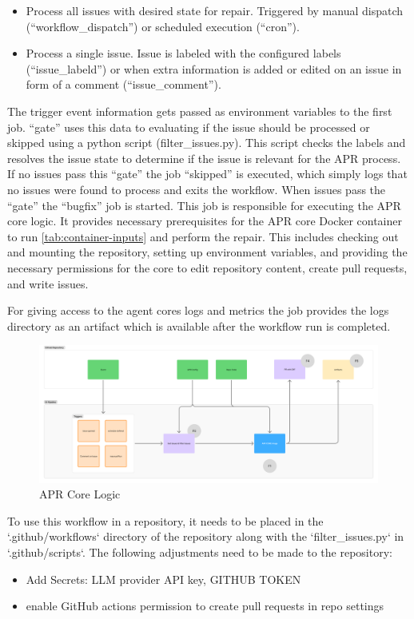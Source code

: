 \begin{itemize}
    \item Process all issues with desired state for repair. Triggered by manual dispatch (``workflow\_dispatch'') or scheduled execution (``cron'').
    \item Process a single issue. Issue is labeled with the configured labels (``issue\_labeld'') or when extra information is added or edited on an issue in form of a comment (``issue\_comment'').
\end{itemize}

The trigger event information gets passed as environment variables to the first job. ``gate'' uses this data to evaluating if the issue should be processed or skipped using a python script (filter\_issues.py). This script checks the labels and resolves the issue state to determine if the issue is relevant for the APR process. If no issues pass this ``gate'' the job ``skipped'' is executed, which simply logs that no issues were found to process and exits the workflow. When issues pass the ``gate'' the ``bugfix'' job is started.  This job is responsible for executing the APR core logic. It provides necessary prerequisites for the APR core Docker container to run \ref{tab:container-inputs} and perform the repair. This includes checking out and mounting the repository, setting up environment variables, and providing the necessary permissions for the core to edit repository content, create pull requests, and write issues.

For giving access to the agent cores logs and metrics the job provides the logs directory as an artifact which is available after the workflow run is completed.

\begin{figure}[H]
    \centering
    \includegraphics[width=1\textwidth]{images/flowcharts/ci.png}
    \caption{APR Core Logic}
    \label{fig:ci}
\end{figure}

To use this workflow in a repository, it needs to be placed in the `.github/workflows` directory of the repository along with the `filter\_issues.py` in `.github/scripts`.
The following adjustments need to be made to the repository:
\begin{itemize}
    \item Add Secrets: LLM provider API key, GITHUB TOKEN
    \item enable GitHub actions permission to create pull requests in repo settings
\end{itemize}


